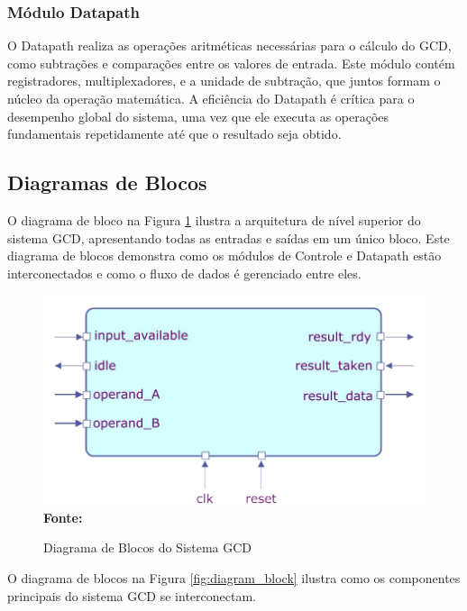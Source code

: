 \documentclass[a4paper,11pt]{article} %
\begin{document}
\subsubsection{Módulo Datapath}
O Datapath realiza as operações aritméticas necessárias para o cálculo do GCD,
como subtrações e comparações entre os valores de entrada.
Este módulo contém registradores, multiplexadores, e a unidade de subtração,
que juntos formam o núcleo da operação matemática.
A eficiência do Datapath é crítica para o desempenho global do sistema,
uma vez que ele executa as operações fundamentais repetidamente até
que o resultado seja obtido.


\subsection{Diagramas de Blocos}
O diagrama de bloco na Figura \ref{fig:top_level}
ilustra a arquitetura de nível superior do sistema GCD,
apresentando todas as entradas e saídas em um único bloco.
Este diagrama de blocos demonstra como os módulos de
Controle e Datapath estão interconectados e como o fluxo de dados é gerenciado entre eles.

\begin{figure}[ht]
    \centering
    \caption{Diagrama de Blocos do Sistema GCD}
    \includegraphics[width=15cm,angle=0]{imgs/diagram_block_top_level.png}
    \\\textbf{Fonte:} \cite{cse_taylor_michael}
    \label{fig:top_level}
\end{figure}

O diagrama de blocos na Figura \ref{fig:diagram_block} ilustra como os componentes principais
do sistema GCD se interconectam.
\end{document}
